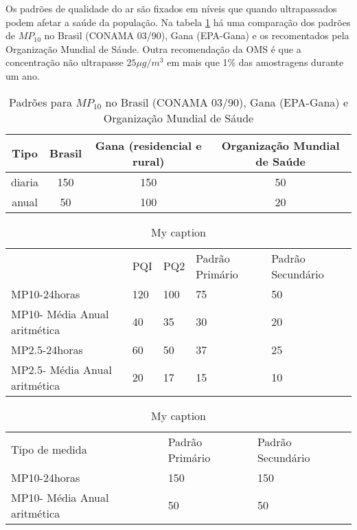 Os padrões de qualidade do ar são fixados em níveis que quando ultrapassados 
podem afetar a saúde da população. 
Na tabela \ref{table:pm10standards} há uma comparação dos padrões de $MP_{10}$ 
no Brasil (CONAMA 03/90), Gana (EPA-Gana) e os recomentados pela Organização
Mundial de Sáude.
Outra recomendação da OMS é que a concentração não ultrapasse $25 \mu g/m^3$ 
em mais que 1\% das amostragens durante um ano. 

\begin{table}[H]
  \centering
  \begin{scriptsize}
      \begin{tabular}{cccc}
     \hline
   Tipo & Brasil & Gana (residencial e rural) & Organização Mundial de Saúde \\
     \hline
   diaria & 150 & 150 &  50 \\
     anual &  50 & 100 &  20 \\
      \hline
  \end{tabular}
  \end{scriptsize}
  \caption{Padrões para $MP_{10}$ no Brasil (CONAMA 03/90), Gana (EPA-Gana) e 
          Organização Mundial de Sáude \label{table:pm10standards}}
\end{table}

\begin{table}[]
\centering
\caption{My caption}
\label{my-label}
\begin{tabular}{lllll}
                              & PQI & PQ2 & Padrão Primário & Padrão Secundário \\
MP10-24horas                  & 120 & 100 & 75              & 50                \\
MP10- Média Anual aritmética  & 40  & 35  & 30              & 20                \\
MP2.5-24horas                 & 60  & 50  & 37              & 25                \\
MP2.5- Média Anual aritmética & 20  & 17  & 15              & 10               
\end{tabular}
\end{table}

\begin{table}[]
\centering
\caption{My caption}
\label{my-label}
\begin{tabular}{lll}
Tipo de medida               & Padrão Primário & Padrão Secundário \\
MP10-24horas                 & 150             & 150               \\
MP10- Média Anual aritmética & 50              & 50               
\end{tabular}
\end{table}

